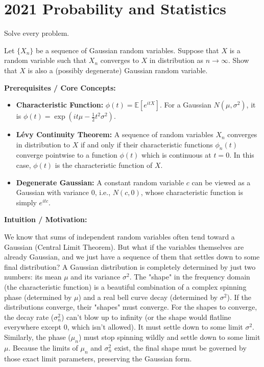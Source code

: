 \section{2021 Probability and Statistics}

Solve every problem.

\begin{exercise}\label{probability:2021:1}
Let $\{X_n\}$ be a sequence of Gaussian random variables. Suppose that $X$ is a random variable such that $X_n$ converges to $X$ in distribution as $n \to \infty$. Show that $X$ is also a (possibly degenerate) Gaussian random variable.
\end{exercise}

\begin{solution}
\textbf{Prerequisites / Core Concepts:}
\begin{itemize}
    \item \textbf{Characteristic Function:} $\phi(t) = \mathbb{E}[e^{itX}]$. For a Gaussian $N(\mu, \sigma^2)$, it is $\phi(t) = \exp(it\mu - \frac{1}{2}t^2\sigma^2)$.
    \item \textbf{Lévy Continuity Theorem:} A sequence of random variables $X_n$ converges in distribution to $X$ if and only if their characteristic functions $\phi_n(t)$ converge pointwise to a function $\phi(t)$ which is continuous at $t=0$. In this case, $\phi(t)$ is the characteristic function of $X$.
    \item \textbf{Degenerate Gaussian:} A constant random variable $c$ can be viewed as a Gaussian with variance $0$, i.e., $N(c, 0)$, whose characteristic function is simply $e^{itc}$.
\end{itemize}

\textbf{Intuition / Motivation:}

We know that sums of independent random variables often tend toward a Gaussian (Central Limit Theorem). But what if the variables themselves are already Gaussian, and we just have a sequence of them that settles down to some final distribution?
A Gaussian distribution is completely determined by just two numbers: its mean $\mu$ and its variance $\sigma^2$. The "shape" in the frequency domain (the characteristic function) is a beautiful combination of a complex spinning phase (determined by $\mu$) and a real bell curve decay (determined by $\sigma^2$).
If the distributions converge, their "shapes" must converge. For the shapes to converge, the decay rate ($\sigma_n^2$) can't blow up to infinity (or the shape would flatline everywhere except 0, which isn't allowed). It must settle down to some limit $\sigma^2$. Similarly, the phase ($\mu_n$) must stop spinning wildly and settle down to some limit $\mu$.
Because the limits of $\mu_n$ and $\sigma_n^2$ exist, the final shape must be governed by those exact limit parameters, preserving the Gaussian form.


\end{solution}
